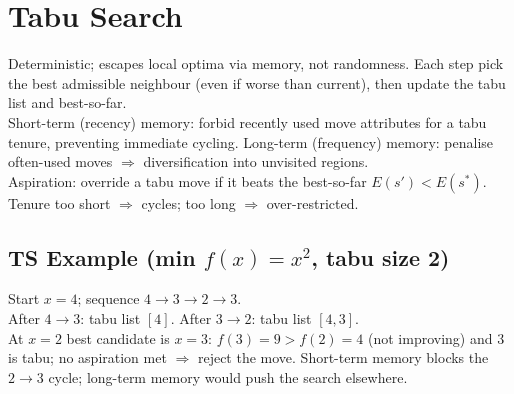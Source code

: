 \section{Tabu Search}
Deterministic; escapes local optima via memory, not randomness. Each step pick the best admissible neighbour (even if worse than current), then update the tabu list and best-so-far.\\
Short-term (recency) memory: forbid recently used move attributes for a tabu tenure, preventing immediate cycling. Long-term (frequency) memory: penalise often-used moves \(\Rightarrow\) diversification into unvisited regions.\\
Aspiration: override a tabu move if it beats the best-so-far \(E(s')<E(s^*)\).\\
Tenure too short \(\Rightarrow\) cycles; too long \(\Rightarrow\) over-restricted.

\subsection*{TS Example (min \(f(x)=x^2\), tabu size 2)}
Start \(x{=}4\); sequence \(4\!\to\!3\!\to\!2\!\to\!3\).\\
After \(4\!\to\!3\): tabu list \([4]\). After \(3\!\to\!2\): tabu list \([4,3]\).\\
At \(x{=}2\) best candidate is \(x{=}3\): \(f(3)=9>f(2)=4\) (not improving) and \(3\) is tabu; no aspiration met \(\Rightarrow\) reject the move. Short-term memory blocks the \(2\!\to\!3\) cycle; long-term memory would push the search elsewhere.
